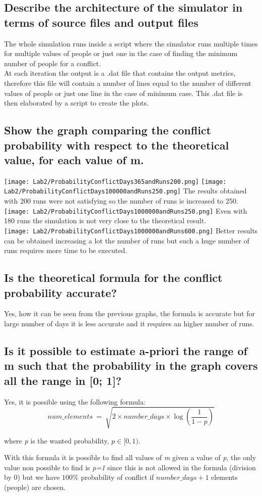 \documentclass{report}
\begin{document}
{	\subsection{Describe the architecture of the simulator in terms of source files and output files}
			The whole simulation runs inside a script where the simulator runs multiple times for multiple values of people or just one in the case of finding the minimum number of people for a conflict. \\
			At each iteration the output is a .dat file that contains the output metrics, therefore this file will contain a number of lines equal to the number of different values of people or just one line in the case of minimum case. This .dat file is then elaborated by a script to create the plots.
		
		\subsection{Show the graph comparing the conflict probability with respect to the theoretical value,
for each value of m.}
				\texttt{[image: Lab2/ProbabilityConflictDays365andRuns200.png]}
				\texttt{[image: Lab2/ProbabilityConflictDays100000andRuns250.png]}
				The results obtained with 200 runs were not satisfying so the number of runs is increased to 250.
				\texttt{[image: Lab2/ProbabilityConflictDays1000000andRuns250.png]}
				Even with 180 runs the simulation is not very close to the theoretical result. \\
				\texttt{[image: Lab2/ProbabilityConflictDays1000000andRuns600.png]}
				Better results can be obtained increasing a lot the number of runs but such a huge number of runs requires more time to be executed.
				
		\subsection{Is the theoretical formula for the conflict probability accurate?}
				Yes, how it can be seen from the previous graphs, the formula is accurate but for large number of days it is less accurate and it requires an higher number of runs.
				
		\subsection{Is it possible to estimate a-priori the range of m such that the probability in the graph covers all the range in [0; 1]?}
				Yes, it is possible using the following formula:
				\[
						num\_elements \: = \: \sqrt{2 \times number\_days \times \log{ \left( \frac{1}{1-p} \right) } }
				\]
				\begin{center}
							where \emph{p} is the wanted probability, $ p \in [0,1)$.
				\end{center}
		With this formula it is possible to find all values of \emph{m} given a value of \emph{p}, the only value non possible to find is \emph{p=1} since this is not allowed in the formula (division by 0) but we have $100\%$ probability of conflict if $number\_days+1$ elements (people) are chosen.
		
}
\end{document}

